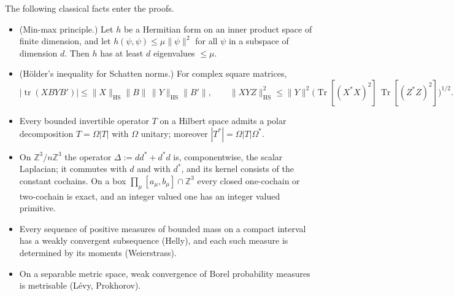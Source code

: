 \documentclass[11pt]{amsart}
\theoremstyle{definition}
\begin{document}
The following classical facts enter the proofs.
\begin{itemize}
\item[(K1)] (Min-max principle.) Let $h$ be a Hermitian form on an inner product space of finite dimension, and let $h(\psi,\psi)\le\mu\|\psi\|^2$ for all $\psi$ in a subspace of dimension $d$.
Then $h$ has at least $d$ eigenvalues $\le\mu$.
\item[(K2)] (H\"older's inequality for Schatten norms.) For complex square matrices,
\begin{equation*}
|\operatorname{tr}(XBYB')|\le\|X\|_{\mathrm{HS}}\|B\|\,\|Y\|_{\mathrm{HS}}\|B'\|,\qquad\|XYZ\|^2_{\mathrm{HS}}\le\|Y\|^2\bigl(\operatorname{Tr}[(X^*X)^2]\,\operatorname{Tr}[(Z^*Z)^2]\bigr)^{1/2}.
\end{equation*}
\item[(K3)] Every bounded invertible operator $T$ on a Hilbert space admits a polar decomposition $T=\Omega|T|$ with $\Omega$ unitary; moreover $|T^*|=\Omega|T|\Omega^*$.
\item[(K4)] On $\mathbb Z^3/n\mathbb Z^3$ the operator $\Delta:=dd^*+d^*d$ is, componentwise, the scalar Laplacian; it commutes with $d$ and with $d^*$, and its kernel consists of the constant cochains.
On a box $\prod_\mu[a_\mu,b_\mu]\cap\mathbb Z^3$ every closed one-cochain or two-cochain is exact, and an integer valued one has an integer valued primitive.
\item[(K5)] Every sequence of positive measures of bounded mass on a compact interval has a weakly convergent subsequence (Helly), and each such measure is determined by its moments (Weierstrass).
\item[(K6)] On a separable metric space, weak convergence of Borel probability measures is metrisable (L\'evy, Prokhorov).
\end{itemize}
\end{document}
